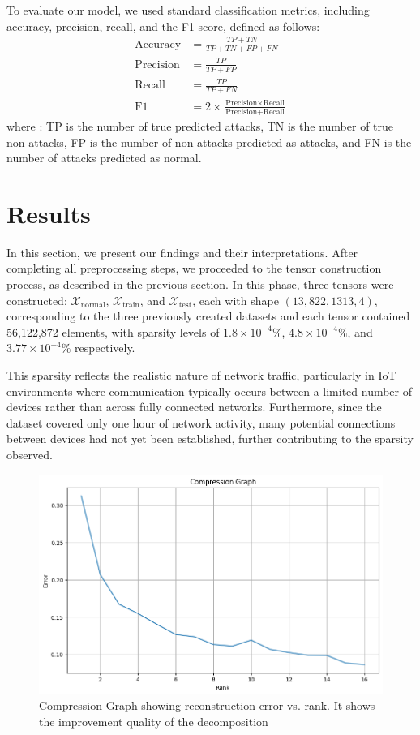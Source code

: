 \documentclass[pdflatex,sn-mathphys-num]{sn-jnl}
\theoremstyle{thmstyleone}
\theoremstyle{thmstyletwo}
\theoremstyle{thmstylethree}
\begin{document}
To evaluate our model, we used standard classification metrics, including accuracy, precision, recall, and the F1-score, defined as follows:
\begin{align}
\text{Accuracy} &= \frac{TP + TN}{TP + TN + FP + FN}\\
\text{Precision} &= \frac{TP}{TP + FP}\\
\text{Recall} &= \frac{TP}{TP + FN}\\
\text{F1} &= 2 \times \frac{\text{Precision} \times \text{Recall}}{\text{Precision} + \text{Recall}}
\end{align}
where :
 TP is the number of true predicted attacks,
TN  is the number of true non attacks,
FP is the number of non attacks predicted as attacks, and 
FN is the number of attacks predicted as normal.






\section{Results}
In this section, we present our findings and their interpretations.   After completing all preprocessing steps, we proceeded to the tensor construction process, as described in the previous section. In this phase, three tensors were constructed; $\mathcal{X}_{\text{normal}}$, $\mathcal{X}_{\text{train}}$, and $\mathcal{X}_{\text{test}}$, each with shape $(13, 822, 1313, 4)$, corresponding to the three previously created datasets and each tensor contained 56,122,872 elements, with sparsity levels of $1.8 \times 10^{-4}\%$, $4.8 \times 10^{-4}\%$, and $3.77 \times 10^{-4}\%$ respectively. 

This sparsity reflects the realistic nature of network traffic, particularly in IoT environments where communication typically occurs between a limited number of devices rather than across fully connected networks. Furthermore, since the dataset covered only one hour of network activity, many potential connections between devices had not yet been established, further contributing to the sparsity observed. 
\begin{figure}
    \centering
    \includegraphics[width=.8\textwidth]{Compression Graph.png}
    \caption{Compression Graph showing reconstruction error vs. rank. It shows the improvement quality of the decomposition}
    \label{fig:Compression graph}
\end{figure}
\end{document}
